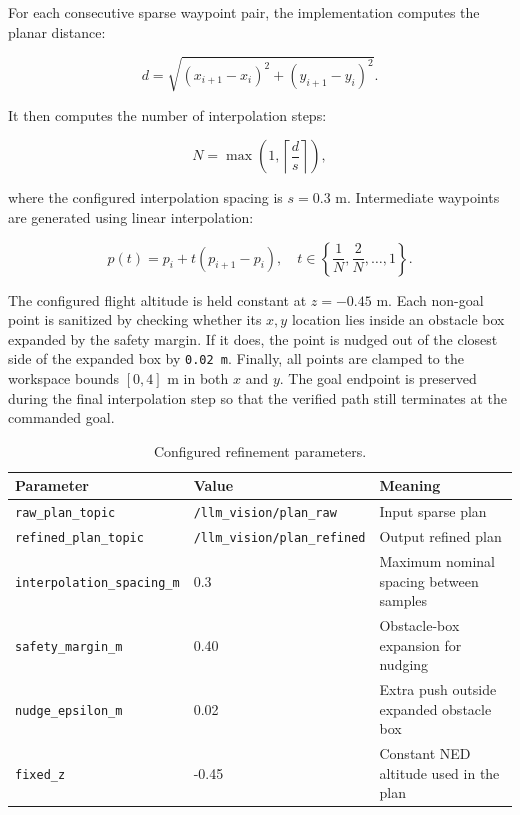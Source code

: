 \documentclass[11pt]{article}
\begin{document}
For each consecutive sparse waypoint pair, the implementation computes the planar distance:

\[
d = \sqrt{(x_{i+1}-x_i)^2 + (y_{i+1}-y_i)^2}.
\]

It then computes the number of interpolation steps:

\[
N = \max\left(1, \left\lceil \frac{d}{s} \right\rceil\right),
\]

where the configured interpolation spacing is \(s = 0.3\) m. Intermediate waypoints are generated using linear interpolation:

\[
p(t) = p_i + t(p_{i+1}-p_i), \quad t \in \left\{\frac{1}{N}, \frac{2}{N}, \ldots, 1\right\}.
\]

The configured flight altitude is held constant at \(z=-0.45\) m. Each non-goal point is sanitized by checking whether its \(x,y\) location lies inside an obstacle box expanded by the safety margin. If it does, the point is nudged out of the closest side of the expanded box by \texttt{0.02 m}. Finally, all points are clamped to the workspace bounds \([0,4]\) m in both \(x\) and \(y\). The goal endpoint is preserved during the final interpolation step so that the verified path still terminates at the commanded goal.

\begin{table}[H]
\centering
\caption{Configured refinement parameters.}
\label{tab:refinement-params}
\begin{tabular}{lll}
\toprule
Parameter & Value & Meaning \\
\midrule
\texttt{raw\_plan\_topic} & \texttt{/llm\_vision/plan\_raw} & Input sparse plan \\
\texttt{refined\_plan\_topic} & \texttt{/llm\_vision/plan\_refined} & Output refined plan \\
\texttt{interpolation\_spacing\_m} & 0.3 & Maximum nominal spacing between samples \\
\texttt{safety\_margin\_m} & 0.40 & Obstacle-box expansion for nudging \\
\texttt{nudge\_epsilon\_m} & 0.02 & Extra push outside expanded obstacle box \\
\texttt{fixed\_z} & -0.45 & Constant NED altitude used in the plan \\
\bottomrule
\end{tabular}
\end{table}
\end{document}
